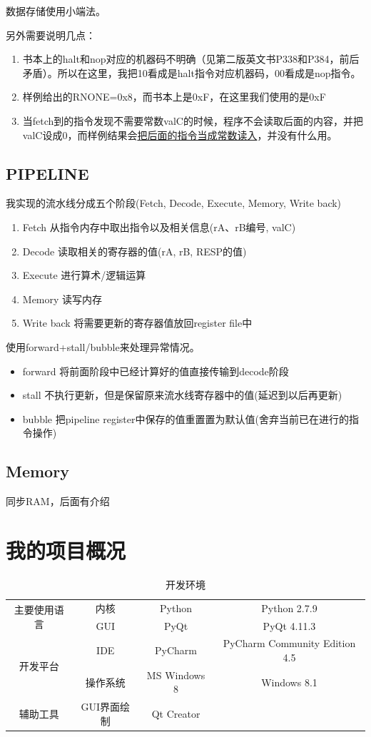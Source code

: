 \documentclass{article}
\begin{document}
数据存储使用小端法。\cite{3}

另外需要说明几点：
\begin{enumerate}
\item 书本上的halt和nop对应的机器码不明确（见第二版英文书P338和P384，前后矛盾）。所以在这里，我把10看成是halt指令对应机器码，00看成是nop指令。
\item 样例给出的RNONE=0x8，而书本上是0xF，在这里我们使用的是0xF
\item 当fetch到的指令发现不需要常数valC的时候，程序不会读取后面的内容，并把valC设成0，而样例结果会\underline{把后面的指令当成常数读入}，并没有什么用。
\end{enumerate}
\subsection{PIPELINE}
我实现的流水线分成五个阶段(Fetch, Decode, Execute, Memory, Write back)
\begin{enumerate}
\item Fetch      从指令内存中取出指令以及相关信息(rA、rB编号, valC)
\item Decode     读取相关的寄存器的值(rA, rB, RESP的值)
\item Execute    进行算术/逻辑运算
\item Memory     读写内存
\item Write back 将需要更新的寄存器值放回register file中
\end{enumerate}

使用forward+stall/bubble来处理异常情况。
\begin{itemize}
\item forward 将前面阶段中已经计算好的值直接传输到decode阶段
\item stall 不执行更新，但是保留原来流水线寄存器中的值(延迟到以后再更新)
\item bubble 把pipeline register中保存的值重置置为默认值(舍弃当前已在进行的指令操作)
\end{itemize}
\subsection{Memory}
同步RAM，后面有介绍
\section{我的项目概况}
\begin{center}
\begin{table}[!ht]     %
\centering
\caption{开发环境}
\large
\begin{tabular}{|c|c|c|c|}
\hline
\multirow{2}{*}{主要使用语言} & 内核 & Python & Python 2.7.9\\
\cline{2-4}
 & GUI & PyQt & PyQt 4.11.3\\
\hline
\multirow{2}{*}{开发平台} & IDE & PyCharm & PyCharm Community Edition 4.5\\
\cline{2-4}
& 操作系统 & MS Windows 8 & Windows 8.1\\
\hline
辅助工具 & GUI界面绘制 & Qt Creator &\\
\hline
\end{tabular}
\end{table}
\end{center}
\end{document}
